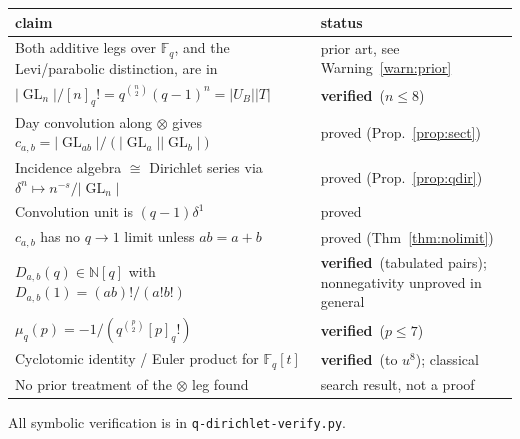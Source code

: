 \documentclass[11pt,a4paper]{article}
\theoremstyle{definition}
\theoremstyle{remark}
\newcommand{\FF}{\mathbb{F}}
\newcommand{\NN}{\mathbb{N}}
\DeclareMathOperator{\GL}{GL}
\newcommand{\norm}[1]{\lvert #1 \rvert}
\newcommand{\OK}{\textcolor{okgreen}{\textbf{verified}}}
\begin{document}
\begin{center}
\small
\begin{tabular}{@{}p{}>{\raggedright\arraybackslash}p{}@{}}
\toprule
claim & status \\
\midrule
Both additive legs over $\FF_q$, and the Levi/parabolic distinction, are in
\cite{GKT-comb,Dur,Morrison,JoyalStreet} & prior art, see Warning~\ref{warn:prior} \\
$\norm{\GL_n}/[n]_q! = q^{\binom n2}(q-1)^n = \norm{U_B}\norm{T}$ & \OK\ ($n\le8$) \\
Day convolution along $\otimes$ gives $c_{a,b} = \norm{\GL_{ab}}/(\norm{\GL_a}\norm{\GL_b})$ &
proved (Prop.~\ref{prop:sect}) \\
Incidence algebra $\cong$ Dirichlet series via $\delta^n \mapsto n^{-s}/\norm{\GL_n}$ &
proved (Prop.~\ref{prop:qdir}) \\
Convolution unit is $(q-1)\delta^1$ & proved \\
$c_{a,b}$ has no $q\to1$ limit unless $ab = a+b$ & proved (Thm~\ref{thm:nolimit}) \\
$D_{a,b}(q) \in \NN[q]$ with $D_{a,b}(1) = (ab)!/(a!b!)$ & \OK\ (tabulated pairs);
nonnegativity unproved in general \\
$\mu_q(p) = -1/(q^{\binom p2}[p]_q!)$ & \OK\ ($p \le 7$) \\
Cyclotomic identity / Euler product for $\FF_q[t]$ & \OK\ (to $u^8$); classical \\
No prior treatment of the $\otimes$ leg found & search result, not a proof \\
\bottomrule
\end{tabular}
\end{center}

All symbolic verification is in \texttt{q-dirichlet-verify.py}.
\end{document}
